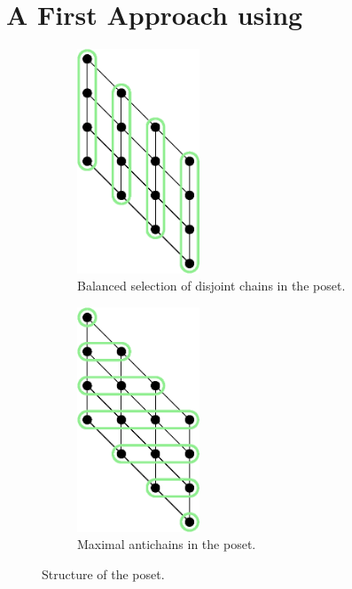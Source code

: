 \section{A First Approach using \mergesort}
\label{tree:xy:merge}

\begin{figure}
\centering
\begin{subfigure}[b]{0.40\textwidth}
\centering
	\includegraphics[width=0.4\textwidth]{fig/x+y/poset/chains}
	\caption{Balanced selection of disjoint chains in the \XY poset.}
	\label{fig:xy:poset:chains}
\end{subfigure}
\begin{subfigure}[b]{0.40\textwidth}
\centering
	\includegraphics[width=0.4\textwidth]{fig/x+y/poset/antichains}
	\caption{Maximal antichains in the \XY poset.}
	\label{fig:xy:poset:antichains}
\end{subfigure}
\caption{Structure of the \XY poset.}
\label{fig:xy:poset:diagrams}
\end{figure}

